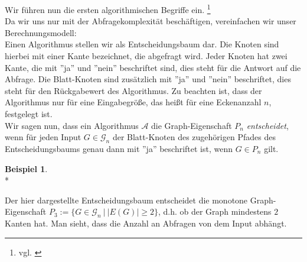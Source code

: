 \documentclass[a4paper]{scrreprt}
\theoremstyle{definition}
\newtheorem{example}{Beispiel}
\begin{document}
Wir führen nun die ersten algorithmischen Begriffe ein.
\footnote{vgl. \cite[S.7]{Rivest}}\\
Da wir uns nur mit der Abfragekomplexität beschäftigen,
vereinfachen wir unser Berechnungsmodell: \\
Einen Algorithmus stellen wir als Entscheidungsbaum dar.
Die Knoten sind hierbei mit einer Kante bezeichnet, die
abgefragt wird. Jeder Knoten hat zwei Kante, die mit
''ja'' und ''nein'' beschriftet sind, dies steht für
die Antwort auf die Abfrage. Die Blatt-Knoten sind
zusätzlich mit ''ja'' und ''nein'' beschriftet,
dies steht für den Rückgabewert des Algorithmus.
Zu beachten ist, dass der Algorithmus nur für eine
Eingabegröße, das heißt für eine Eckenanzahl $n$,
festgelegt ist.\\
Wir sagen nun, dass ein Algorithmus $\mathcal{A}$
die Graph-Eigenschaft $P_n$ \emph{entscheidet}, wenn
für jeden Input $G \in \mathcal{G}_n$ der Blatt-Knoten
des zugehörigen Pfades des Entscheidungsbaums genau
dann mit ''ja'' beschriftet ist, wenn $G \in P_n$ gilt.

\begin{example} \ \\*
\label{exmpl:decisionTree}
\begin{center}
\end{center}
Der hier dargestellte Entscheidungsbaum entscheidet
die monotone Graph-Eigenschaft 
$P_3 := \big\{ G \in \mathcal{G}_n \ \big| \ |E(G)| \geq 2 \big\}$,
d.h. ob der Graph mindestens $2$ Kanten hat.
Man sieht, dass die Anzahl an Abfragen von
dem Input abhängt.
\end{example}
\end{document}
